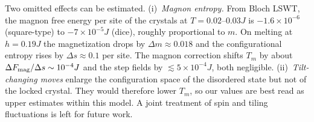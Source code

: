 \documentclass[prb,twocolumn,amsmath,amssymb,floatfix]{revtex4-2}
\begin{document}
Two omitted effects can be estimated. (i)~\emph{Magnon entropy.} From Bloch LSWT, the magnon free energy per site of the crystals at $T=0.02$--$0.03J$ is $-1.6\times10^{-6}$ (square-type) to $-7\times10^{-5}J$ (dice), roughly proportional to $m$. On melting at $h=0.19J$ the magnetization drops by $\Delta m\approx0.018$ and the configurational entropy rises by $\Delta s\approx0.1$ per site. The magnon correction shifts $T_m$ by about $\Delta F_{\rm mag}/\Delta s\sim10^{-4}J$ and the step fields by $\lesssim5\times10^{-4}J$, both negligible. (ii)~\emph{Tilt-changing moves} enlarge the configuration space of the disordered state but not of the locked crystal. They would therefore lower $T_m$, so our values are best read as upper estimates within this model. A joint treatment of spin and tiling fluctuations is left for future work.
\end{document}

